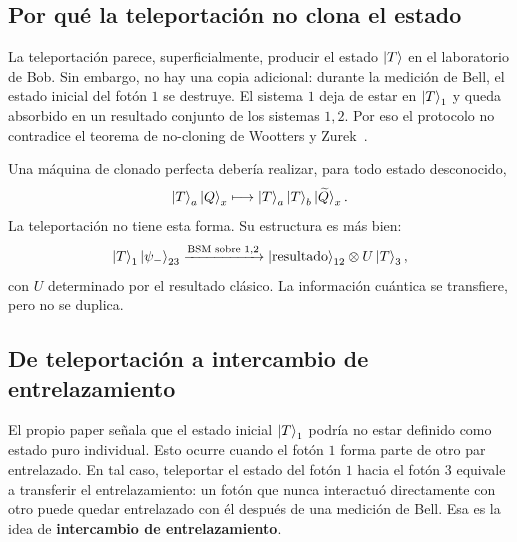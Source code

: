 \documentclass[12pt,a4paper]{article}
\theoremstyle{definition}
\theoremstyle{plain}
\theoremstyle{remark}
\begin{document}
\subsection{Por qué la teleportación no clona el estado}

La teleportación parece, superficialmente, producir el estado $\ket{T}$ en el laboratorio de Bob. Sin embargo, no hay una copia adicional: durante la medición de Bell, el estado inicial del fotón $1$ se destruye. El sistema $1$ deja de estar en $\ket{T}_1$ y queda absorbido en un resultado conjunto de los sistemas $1,2$. Por eso el protocolo no contradice el teorema de no-cloning de Wootters y Zurek~\cite{WoottersZurek1982}.

Una máquina de clonado perfecta debería realizar, para todo estado desconocido,
\begin{equation*}
    \ket{T}_a\ket{Q}_x
    \longmapsto
    \ket{T}_a\ket{T}_b\ket{\widetilde Q}_x.
\end{equation*}
La teleportación no tiene esta forma. Su estructura es más bien:
\begin{equation*}
    \ket{T}_1\ket{\psi_-}_{23}
    \xrightarrow{\text{BSM sobre }1,2}
    \ket{\text{resultado}}_{12}\otimes U\ket{T}_3,
\end{equation*}
con $U$ determinado por el resultado clásico. La información cuántica se transfiere, pero no se duplica.

\subsection{De teleportación a intercambio de entrelazamiento}

El propio paper señala que el estado inicial $\ket{T}_1$ podría no estar definido como estado puro individual. Esto ocurre cuando el fotón $1$ forma parte de otro par entrelazado. En tal caso, teleportar el estado del fotón $1$ hacia el fotón $3$ equivale a transferir el entrelazamiento: un fotón que nunca interactuó directamente con otro puede quedar entrelazado con él después de una medición de Bell. Esa es la idea de \textbf{intercambio de entrelazamiento}.
\end{document}
